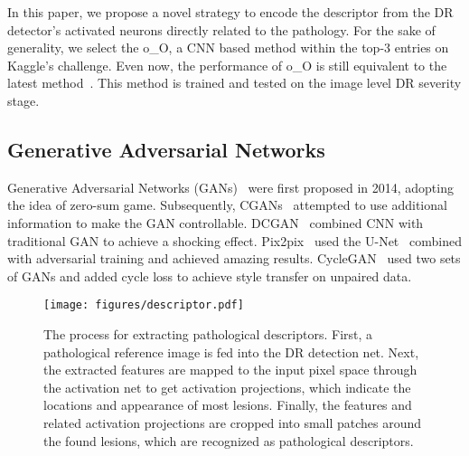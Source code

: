 \documentclass[letterpaper]{article} %
\begin{document}
     In this paper, we propose a novel strategy to encode the descriptor from the DR detector's activated neurons directly related to the pathology. For the sake of generality, we select the o\_O\cite{oO2016detector}, a CNN based method within the top-3 entries on Kaggle's challenge. Even now, the performance of o\_O is still equivalent to the latest method~\cite{wang2017zoom}. This method is trained and tested on the image level DR severity stage.





















	\subsection{Generative Adversarial Networks}
Generative Adversarial Networks (GANs)~\cite{goodfellow2014generative} were first proposed in 2014, adopting the idea of zero-sum game. Subsequently, CGANs~\cite{mirza2014conditional} attempted to use additional information to make the GAN controllable. DCGAN~\cite{radford2015unsupervised} combined CNN with traditional GAN to achieve a shocking effect. Pix2pix~\cite{isola2017image} used the U-Net~\cite{ronneberger2015u} combined with adversarial training and achieved amazing results. CycleGAN~\cite{zhu2017unpaired} used two sets of GANs and added cycle loss to achieve style transfer on unpaired data.


    		\begin{figure*}[h!]
		\begin{center}
			\texttt{[image: figures/descriptor.pdf]}
		\end{center}
		\caption{The process for extracting pathological descriptors. First, a pathological reference image is fed into the DR detection net. Next, the extracted features are mapped to the input pixel space through the activation net to get activation projections, which indicate the locations and appearance of most lesions. Finally, the features and related activation projections are cropped into small patches around the found lesions, which are recognized as pathological descriptors. }
		\label{fig:descriptor}
	\end{figure*}
\end{document}
